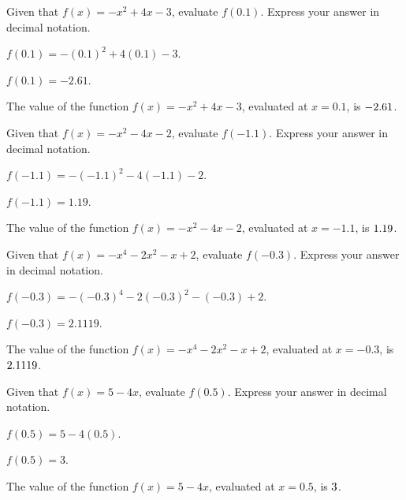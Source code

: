 \begin{shuffle}
\begin{exercise}
Given that $f(x)=-x^2+4 x-3$, evaluate $f(0.1)$. Express your answer in decimal notation.
\begin{solution}
\begin{hint}
$f(0.1)=-(0.1)^2+4 (0.1)-3$.
\end{hint}
\begin{hint}
$f(0.1)=-2.61$.
\end{hint}
The value of the function $f(x) = -x^2+4 x-3$, evaluated at $x=0.1$, is ${-2.61}$.
\end{solution}
\end{exercise}

\begin{exercise}
Given that $f(x)=-x^2-4 x-2$, evaluate $f(-1.1)$. Express your answer in decimal notation.
\begin{solution}
\begin{hint}
$f(-1.1)=-(-1.1)^2-4 (-1.1)-2$.
\end{hint}
\begin{hint}
$f(-1.1)=1.19$.
\end{hint}
The value of the function $f(x) = -x^2-4 x-2$, evaluated at $x=-1.1$, is ${1.19}$.
\end{solution}
\end{exercise}

\begin{exercise}
Given that $f(x)=-x^4-2 x^2-x+2$, evaluate $f(-0.3)$. Express your answer in decimal notation.
\begin{solution}
\begin{hint}
$f(-0.3)=-(-0.3)^4-2 (-0.3)^2-(-0.3)+2$.
\end{hint}
\begin{hint}
$f(-0.3)=2.1119$.
\end{hint}
The value of the function $f(x) = -x^4-2 x^2-x+2$, evaluated at $x=-0.3$, is ${2.1119}$.
\end{solution}
\end{exercise}

\begin{exercise}
Given that $f(x)=5-4 x$, evaluate $f(0.5)$. Express your answer in decimal notation.
\begin{solution}
\begin{hint}
$f(0.5)=5-4 (0.5)$.
\end{hint}
\begin{hint}
$f(0.5)=3$.
\end{hint}
The value of the function $f(x) = 5-4 x$, evaluated at $x=0.5$, is ${3}$.
\end{solution}
\end{exercise}


\end{shuffle}
